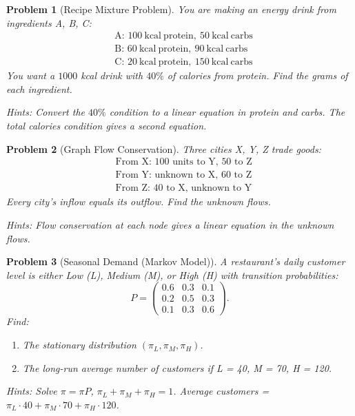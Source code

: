 \documentclass[11pt]{article}
\theoremstyle{upright}
\newtheorem{problem}{Problem}
\begin{document}
\begin{problem}[Recipe Mixture Problem]
You are making an energy drink from ingredients A, B, C:
\[
\begin{aligned}
&\text{A: } 100\ \mathrm{kcal\ protein},\ 50\ \mathrm{kcal\ carbs} \\
&\text{B: } 60\ \mathrm{kcal\ protein},\ 90\ \mathrm{kcal\ carbs} \\
&\text{C: } 20\ \mathrm{kcal\ protein},\ 150\ \mathrm{kcal\ carbs}
\end{aligned}
\]
You want a $1000$ kcal drink with $40\%$ of calories from protein. Find the grams of each ingredient.

\textit{Hints:}  
Convert the $40\%$ condition to a linear equation in protein and carbs. The total calories condition gives a second equation.
\end{problem}

\begin{problem}[Graph Flow Conservation]
Three cities X, Y, Z trade goods:
\[
\begin{aligned}
&\text{From X: } 100 \text{ units to Y, } 50 \text{ to Z} \\
&\text{From Y: unknown to X, } 60 \text{ to Z} \\
&\text{From Z: } 40 \text{ to X, unknown to Y}
\end{aligned}
\]
Every city’s inflow equals its outflow. Find the unknown flows.

\textit{Hints:}  
Flow conservation at each node gives a linear equation in the unknown flows.
\end{problem}

\begin{problem}[Seasonal Demand (Markov Model)]
A restaurant’s daily customer level is either Low (L), Medium (M), or High (H) with transition probabilities:
\[
P = \begin{pmatrix}
0.6 & 0.3 & 0.1 \\
0.2 & 0.5 & 0.3 \\
0.1 & 0.3 & 0.6
\end{pmatrix}.
\]
Find:
\begin{enumerate}
    \item The stationary distribution $(\pi_L,\pi_M,\pi_H)$.
    \item The long-run average number of customers if L = 40, M = 70, H = 120.
\end{enumerate}

\textit{Hints:}  
Solve $\pi = \pi P$, $\pi_L + \pi_M + \pi_H = 1$. Average customers = $\pi_L \cdot 40 + \pi_M \cdot 70 + \pi_H \cdot 120$.
\end{problem}
\end{document}
